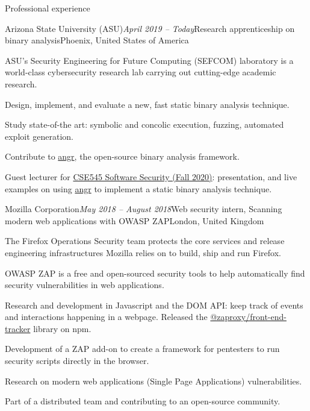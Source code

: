 \begin{rSection}{Professional experience}
  \begin{rSubsection}{Arizona State University (ASU)}{\em April 2019 -- Today}{Research apprenticeship on binary analysis}{Phoenix, United States of America}
    \item[]
      ASU's Security Engineering for Future Computing (SEFCOM) laboratory is a world-class cybersecurity research lab carrying out cutting-edge academic research.
    \item Design, implement, and evaluate a new, fast static binary analysis technique.
    \item Study state-of-the art: symbolic and concolic execution, fuzzing, automated exploit generation.
    \item Contribute to \href{https://angr.io/}{angr}, the open-source binary analysis framework.
    \item Guest lecturer for \href{https://www.tiffanybao.com/courses/cse545/}{CSE545 Software Security (Fall 2020)}: presentation, and live examples on using \href{https://angr.io/}{angr} to implement a static binary analysis technique.
  \end{rSubsection}


  \begin{rSubsection}{Mozilla Corporation}{\em May 2018 -- August 2018}{Web security intern, Scanning modern web applications with OWASP ZAP}{London, United Kingdom}
    \item[]
      The Firefox Operations Security team protects the core services and release engineering infrastructures Mozilla relies on to build, ship and run Firefox.
    \item[]
      OWASP ZAP is a free and open-sourced security tools to help automatically find security vulnerabilities in web applications.

    \item Research and development in Javascript and the DOM API: keep track of events and interactions happening in a webpage. Released the \href{https://www.npmjs.com/package/@zaproxy/front-end-tracker}{@zaproxy/front-end-tracker} library on npm.
    \item Development of a ZAP add-on to create a framework for pentesters to run security scripts directly in the browser.
    \item Research on modern web applications (Single Page Applications) vulnerabilities.
    \item Part of a distributed team and contributing to an open-source community.
  \end{rSubsection}


\end{rSection}
